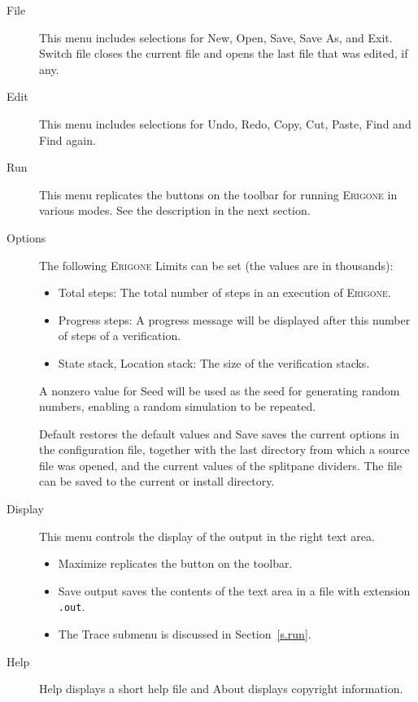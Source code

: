 \documentclass[11pt]{article}
\newcommand{\eri}{\textsc{Erigone}}
\newcommand{\p}[1]{\texttt{#1}}
\newcommand{\bu}[1]{\textsf{#1}}
\begin{document}
\begin{description}
\item[\bu{File}] This menu includes selections for \bu{New}, \bu{Open}, 
\bu{Save}, \bu{Save As}, and \bu{Exit}. \bu{Switch file} closes the 
current file and opens the last file that was edited, if any.

\item[\bu{Edit}] This menu includes selections for \bu{Undo}, \bu{Redo}, 
\bu{Copy}, \bu{Cut}, \bu{Paste}, \bu{Find} and \bu{Find again}.

\item[\bu{Run}] This menu replicates the buttons on the toolbar for
running \eri{} in various modes. See the description in the next
section.

\item[\bu{Options}] The following \eri{} \bu{Limits} can be set (the
values are in thousands):
\begin{itemize}
\item \bu{Total steps}: The total number of steps in an execution of
\eri{}.
\item \bu{Progress steps}: A progress message will be displayed
after this number of steps of a verification.
\item \bu{State stack}, \bu{Location stack}: The size of the
verification stacks.
\end{itemize}

A nonzero value for \bu{Seed} will be used as the seed for generating
random numbers, enabling a random simulation to be repeated.

\bu{Default} restores the default values and \bu{Save} saves the current
options in the configuration file, together with the last directory from
which a source file was opened, and the current values of the splitpane
dividers. The file can be saved to the \bu{current} or \bu{install}
directory.

\item[\bu{Display}] This menu controls the display of the output in the
right text area.
\begin{itemize}
\item \bu{Maximize} replicates the button on the toolbar.
\item \bu{Save output} saves the contents of the text area in a file with
extension \p{.out}.
\item The \bu{Trace} submenu is discussed in
Section~\ref{s.run}.
\end{itemize}

\item[\bu{Help}] \bu{Help} displays a short help file and \bu{About} 
displays copyright information.
\end{description}
\end{document}
